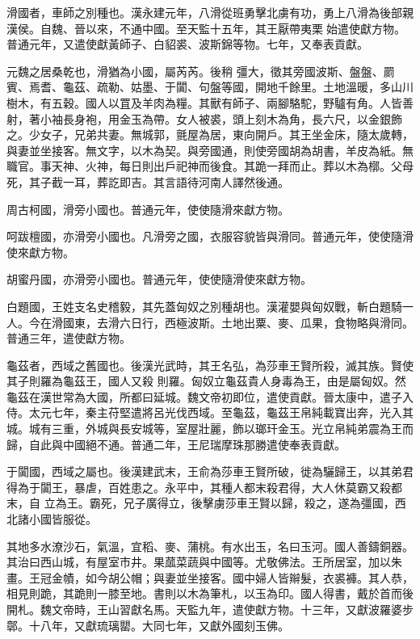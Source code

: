 \begin{pinyinscope}
 滑國者，車師之別種也。漢永建元年，八滑從班勇擊北虜有功，勇上八滑為後部親漢侯。自魏、晉以來，不通中國。至天監十五年，其王厭帶夷栗始遣使獻方物。普通元年，又遣使獻黃師子、白貂裘、波斯錦等物。七年，又奉表貢獻。



 元魏之居桑乾也，滑猶為小國，屬芮芮。後稍
 彊大，徵其旁國波斯、盤盤、罽賓、焉耆、龜茲、疏勒、姑墨、于闐、句盤等國，開地千餘里。土地溫暖，多山川樹木，有五穀。國人以罝及羊肉為糧。其獸有師子、兩腳駱駝，野驢有角。人皆善射，著小袖長身袍，用金玉為帶。女人被裘，頭上刻木為角，長六尺，以金銀飾之。少女子，兄弟共妻。無城郭，氈屋為居，東向開戶。其王坐金床，隨太歲轉，與妻並坐接客。無文字，以木為契。與旁國通，則使旁國胡為胡書，羊皮為紙。無職官。事天神、火神，每日則出戶祀神而後食。其跪一拜而止。葬以木為槨。父母死，其子截一耳，葬訖即吉。其言語待河南人譯然後通。



 周古柯國，滑旁小國也。普通元年，使使隨滑來獻方物。



 呵跋檀國，亦滑旁小國也。凡滑旁之國，衣服容貌皆與滑同。普通元年，使使隨滑使來獻方物。



 胡蜜丹國，亦滑旁小國也。普通元年，使使隨滑使來獻方物。



 白題國，王姓支名史稽毅，其先蓋匈奴之別種胡也。漢灌嬰與匈奴戰，斬白題騎一人。今在滑國東，去滑六日行，西極波斯。土地出粟、麥、瓜果，食物略與滑同。普通三年，遣使獻方物。



 龜茲者，西域之舊國也。後漢光武時，其王名弘，為莎車王賢所殺，滅其族。賢使其子則羅為龜茲王，國人又殺
 則羅。匈奴立龜茲貴人身毒為王，由是屬匈奴。然龜茲在漢世常為大國，所都曰延城。魏文帝初即位，遣使貢獻。晉太康中，遣子入侍。太元七年，秦主苻堅遣將呂光伐西域。至龜茲，龜茲王帛純載寶出奔，光入其城。城有三重，外城與長安城等，室屋壯麗，飾以瑯玕金玉。光立帛純弟震為王而歸，自此與中國絕不通。普通二年，王尼瑞摩珠那勝遣使奉表貢獻。



 于闐國，西域之屬也。後漢建武末，王俞為莎車王賢所破，徙為驪歸王，以其弟君得為于闐王，暴虐，百姓患之。永平中，其種人都末殺君得，大人休莫霸又殺都末，自
 立為王。霸死，兄子廣得立，後擊虜莎車王賢以歸，殺之，遂為彊國，西北諸小國皆服從。



 其地多水潦沙石，氣溫，宜稻、麥、蒲桃。有水出玉，名曰玉河。國人善鑄銅器。其治曰西山城，有屋室市井。果蓏菜蔬與中國等。尤敬佛法。王所居室，加以朱畫。王冠金幘，如今胡公帽；與妻並坐接客。國中婦人皆辮髮，衣裘褲。其人恭，相見則跪，其跪則一膝至地。書則以木為筆札，以玉為印。國人得書，戴於首而後開札。魏文帝時，王山習獻名馬。天監九年，遣使獻方物。十三年，又獻波羅婆步鄣。十八年，又獻琉璃罌。大同七年，又獻外國刻玉佛。




\end{pinyinscope}
